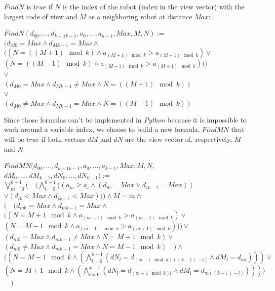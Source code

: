 \documentclass{article}
\begin{document}
$FindN$ is $true$ if $N$ is the index of the robot  (index in the view vector) with the largest code of view and $M$ as a neighboring robot at distance $Max$:

\begin{center}

$FindN (d_{00}, \ldots ,d_{k-1k-1}, a_{0}, \ldots , a_{k-1}, Max, M, N):=$\\
$ (d_{M0} = Max \land d_{Mk-1} = Max \land $\\
$ (  (N =  ( (M+1) \mod{k}) \land a_{ (M+1) \mod{k}} > a_{ (M-1) \mod{k}}) \lor $\\
$ (N =  ( (M-1) \mod{k}) \land a_{ (M-1) \mod{k}} > a_{ (M+1) \mod{k}})))$\\
$ \lor$\\
$ (d_{M0} = Max \land d_{Mk-1} \not= Max \land N =  ( (M+1)\mod{k}))$\\
$ \lor$\\
$ (d_{M0} \not= Max \land d_{Mk-1} = Max \land N =  ( (M-1)\mod{k}))$
\end{center}

Since those formulas can't be implemented in \textit{Python} because it is impossible to work around a variable index, we choose to build a new formula, $FindMN$ that will be $true$ if both vectors $dM$ and $dN$ are the view vector of, respectively, $M$ and $N$.

\begin{center}

$FindMN (d_{00}, \ldots ,d_{k-1k-1}, a_{0}, \ldots , a_{k-1}, Max, M, N,$\\
$ dM_{0}, \dots, dM_{k-1}, dN_{0}, \dots, dN_{k-1}):=$\\
$\bigvee_{m=0}^{k-1} (\quad
 (\bigwedge_{i=0}^{k-1}  ( (a_{m} \geq a_i \land  (d_{i0} = Max \lor d_{ik-1} = Max))$\\
$\lor  (d_{i0} < Max \land d_{ik-1} < Max))) \land M = m \land $\\ 
$ (\quad  (
d_{m0} = Max \land d_{mk-1} = Max \land $\\
$ (  ( N = M+1 \mod k \land a_{ (m+1) \mod{k}} > a_{ (m-1) \mod{k}}) \lor $\\
$ ( N = M-1 \mod{k} \land a_{ (m-1) \mod{k}} > a_{ (m+1) \mod{k}}))
)\lor $\\
$ (
d_{m0} = Max \land d_{mk-1} \not= Max \land N = M+1 \mod k
) \lor$\\
$ (
d_{m0} \not= Max \land d_{mk-1} = Max \land N = M-1 \mod{k}
)\quad ) \land $\\
$ (  (N = M-1\mod{k} \land  (\bigwedge_{l = 0}^{k-1}  (dN_{l} = d_{ (m-1 \mod{k})  ( (k-1)-l)} \land dM_{l} = d_{ml}) ) ) \lor $\\
$ (N = M+1\mod{k} \land  (\bigwedge_{l = 0}^{k-1}  (dN_{l} = d_{ (m+1 \mod{k})l} \land dM_{l} = d_{m ( (k-1)-l)}) ) ) )$
$\quad )$
\end{center}
\end{document}
